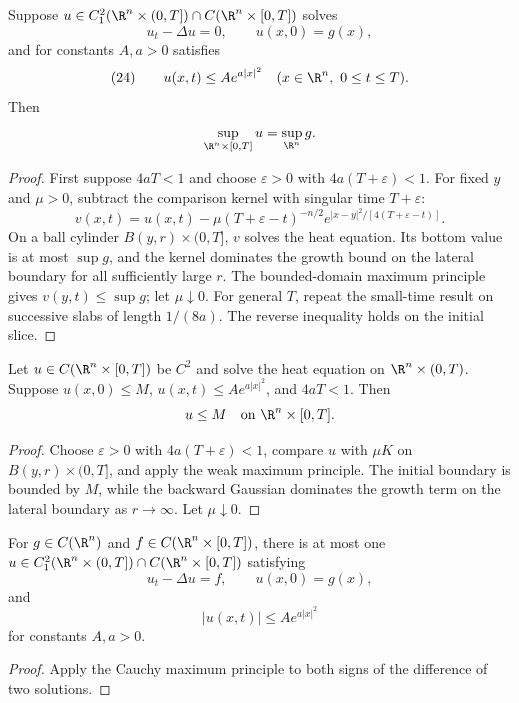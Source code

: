 \begin{theorem}
\label{thm:maximum-principle-heat-cauchy-problem}
\leanok
Suppose $u\in C_1^2(\R^n\times(0,T])\cap C(\R^n\times[0,T])$ solves
$$u_t-\Delta u=0,
\qquad
u(x,0)=g(x),$$
and for constants $A,a>0$ satisfies
$$(24)\qquad u(x,t)\le Ae^{a|x|^2}
\quad(x\in\R^n,\ 0\le t\le T).$$
Then
$$\sup_{\R^n\times[0,T]}u=\sup_{\R^n}g.$$
\end{theorem}
\begin{proof}
\sketch First suppose $4aT<1$ and choose $\varepsilon>0$ with
$4a(T+\varepsilon)<1$. For fixed $y$ and $\mu>0$, subtract the comparison
kernel with singular time $T+\varepsilon$:
$$v(x,t)=u(x,t)-\mu(T+\varepsilon-t)^{-n/2}
e^{|x-y|^2/[4(T+\varepsilon-t)]}.$$
On a ball cylinder $B(y,r)\times(0,T]$, $v$ solves the heat equation. Its
bottom value is at most $\sup g$, and the kernel dominates the growth bound
on the lateral boundary for all sufficiently large $r$. The bounded-domain
maximum principle gives $v(y,t)\le\sup g$; let $\mu\downarrow0$. For general
$T$, repeat the small-time result on successive slabs of length $1/(8a)$.
The reverse inequality holds on the initial slice.
\end{proof}

\begin{theorem}
\label{thm:maximum-principle-heat-cauchy-problem-smalltime}
\leanok
Let $u\in C(\R^n\times[0,T])$ be $C^2$ and solve the heat equation on
$\R^n\times(0,T)$. Suppose $u(x,0)\le M$,
$u(x,t)\le Ae^{a|x|^2}$, and $4aT<1$. Then
$$u\le M\quad\text{on }\R^n\times[0,T].$$
\end{theorem}
\begin{proof}
\sketch Choose $\varepsilon>0$ with $4a(T+\varepsilon)<1$, compare $u$ with
$\mu K$ on $B(y,r)\times(0,T]$, and apply the weak maximum principle. The
initial boundary is bounded by $M$, while the backward Gaussian dominates the
growth term on the lateral boundary as $r\to\infty$. Let $\mu\downarrow0$.
\end{proof}

\begin{theorem}
\label{thm:uniqueness-heat-cauchy-problem}
\leanok
For $g\in C(\R^n)$ and $f\in C(\R^n\times[0,T])$, there is at most one
$u\in C_1^2(\R^n\times(0,T])\cap C(\R^n\times[0,T])$ satisfying
$$u_t-\Delta u=f,
\qquad
u(x,0)=g(x),$$
and
$$|u(x,t)|\le Ae^{a|x|^2}$$
for constants $A,a>0$.
\end{theorem}
\begin{proof}
\sketch Apply the Cauchy maximum principle to both signs of the difference of
two solutions.
\end{proof}

